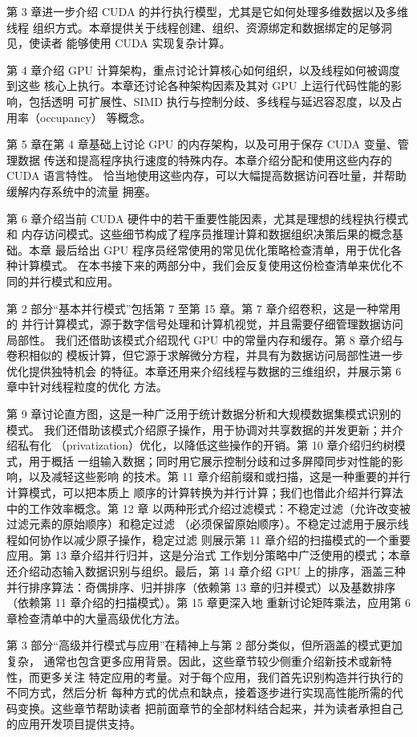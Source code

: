 第 3 章进一步介绍 CUDA 的并行执行模型，尤其是它如何处理多维数据以及多维线程
组织方式。本章提供关于线程创建、组织、资源绑定和数据绑定的足够洞见，使读者
能够使用 CUDA 实现复杂计算。

第 4 章介绍 GPU 计算架构，重点讨论计算核心如何组织，以及线程如何被调度到这些
核心上执行。本章还讨论各种架构因素及其对 GPU 上运行代码性能的影响，包括透明
可扩展性、SIMD 执行与控制分歧、多线程与延迟容忍度，以及占用率（occupancy）
等概念。

第 5 章在第 4 章基础上讨论 GPU 的内存架构，以及可用于保存 CUDA 变量、管理数据
传送和提高程序执行速度的特殊内存。本章介绍分配和使用这些内存的 CUDA 语言特性。
恰当地使用这些内存，可以大幅提高数据访问吞吐量，并帮助缓解内存系统中的流量
拥塞。

第 6 章介绍当前 CUDA 硬件中的若干重要性能因素，尤其是理想的线程执行模式和
内存访问模式。这些细节构成了程序员推理计算和数据组织决策后果的概念基础。本章
最后给出 GPU 程序员经常使用的常见优化策略检查清单，用于优化各种计算模式。
在本书接下来的两部分中，我们会反复使用这份检查清单来优化不同的并行模式和应用。

第 2 部分“基本并行模式”包括第 7 至第 15 章。第 7 章介绍卷积，这是一种常用的
并行计算模式，源于数字信号处理和计算机视觉，并且需要仔细管理数据访问局部性。
我们还借助该模式介绍现代 GPU 中的常量内存和缓存。第 8 章介绍与卷积相似的
模板计算，但它源于求解微分方程，并具有为数据访问局部性进一步优化提供独特机会
的特征。本章还用来介绍线程与数据的三维组织，并展示第 6 章中针对线程粒度的优化
方法。

第 9 章讨论直方图，这是一种广泛用于统计数据分析和大规模数据集模式识别的模式。
我们还借助该模式介绍原子操作，用于协调对共享数据的并发更新；并介绍私有化
（privatization）优化，以降低这些操作的开销。第 10 章介绍归约树模式，用于概括
一组输入数据；同时用它展示控制分歧和过多屏障同步对性能的影响，以及减轻这些影响
的技术。第 11 章介绍前缀和或扫描，这是一种重要的并行计算模式，可以把本质上
顺序的计算转换为并行计算；我们也借此介绍并行算法中的工作效率概念。第 12 章
以两种形式介绍过滤模式：不稳定过滤（允许改变被过滤元素的原始顺序）和稳定过滤
（必须保留原始顺序）。不稳定过滤用于展示线程如何协作以减少原子操作，稳定过滤
则展示第 11 章介绍的扫描模式的一个重要应用。第 13 章介绍并行归并，这是分治式
工作划分策略中广泛使用的模式；本章还介绍动态输入数据识别与组织。最后，第
14 章介绍 GPU 上的排序，涵盖三种并行排序算法：奇偶排序、归并排序（依赖第 13
章的归并模式）以及基数排序（依赖第 11 章介绍的扫描模式）。第 15 章更深入地
重新讨论矩阵乘法，应用第 6 章检查清单中的大量高级优化方法。

第 3 部分“高级并行模式与应用”在精神上与第 2 部分类似，但所涵盖的模式更加复杂，
通常也包含更多应用背景。因此，这些章节较少侧重介绍新技术或新特性，而更多关注
特定应用的考量。对于每个应用，我们首先识别构造并行执行的不同方式，然后分析
每种方式的优点和缺点，接着逐步进行实现高性能所需的代码变换。这些章节帮助读者
把前面章节的全部材料结合起来，并为读者承担自己的应用开发项目提供支持。

